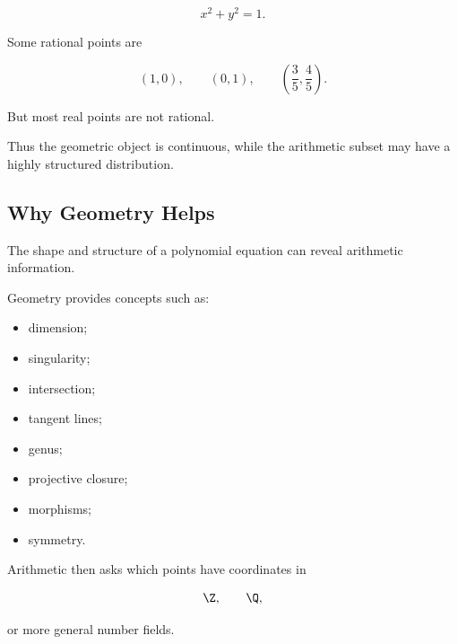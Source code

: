 \[ x^2+y^2=1. \]

Some rational points are

\[ (1,0),\qquad(0,1),\qquad\left(\frac35,\frac45\right). \]

But most real points are not rational.

Thus the geometric object is continuous, while the arithmetic subset may
have a highly structured distribution.

\begin{centereddiagram}
\end{centereddiagram}

\subsection{Why Geometry Helps}
\label{subsec:why-geometry-helps-diophantine}

The shape and structure of a polynomial equation can reveal arithmetic
information.

Geometry provides concepts such as:

\begin{itemize}
    \item dimension;
    \item singularity;
    \item intersection;
    \item tangent lines;
    \item genus;
    \item projective closure;
    \item morphisms;
    \item symmetry.
\end{itemize}

Arithmetic then asks which points have coordinates in

\[ \Z,\qquad\Q, \]

or more general number fields.

